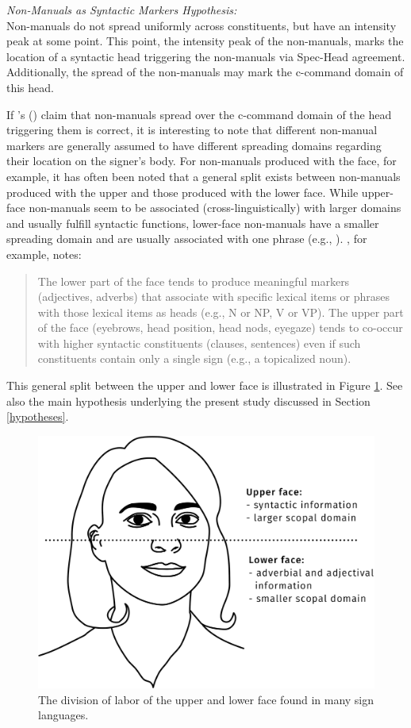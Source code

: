 \begin{exe}
\ex \textit{Non-Manuals as Syntactic Markers Hypothesis:}\\
Non-manuals do not spread uniformly across constituents, but have an intensity peak at some point. This point, the intensity peak of the non-manuals, marks the location of a syntactic head triggering the non-manuals via Spec-Head agreement. Additionally, the spread of the non-manuals may mark the c-command domain of this head. \label{nmasmh}
\end{exe}

\noindent If \citeauthor{neidle2000syntax}'s (\citeyear{neidle2000syntax}) claim that non-manuals spread over the c-command domain of the head triggering them is correct, it is interesting to note that different non-manual markers are generally assumed to have different spreading domains regarding their location on the signer's body. For non-manuals produced with the face, for example, it has often been noted that a general split exists between non-manuals produced with the upper and those produced with the lower face. While upper-face non-manuals seem to be associated (cross-linguistically) with larger domains and usually fulfill syntactic functions, lower-face non-manuals have a smaller spreading domain and are usually associated with one phrase (e.g., \citealt{liddell1980american, coerts1992nonmanual, wilbur2000phonological, wilbur2003modality, brentari2002prosody}). \citet[249]{wilbur2009productive}, for example, notes: 


\begin{quote}
The lower part\label{wilburquote} of the face tends to produce meaningful markers (adjectives, adverbs) that associate with specific lexical items or phrases with those lexical items as heads (e.g., N or NP, V or VP). The upper part of the face (eyebrows, head position, head nods, eyegaze) tends to co-occur with higher syntactic constituents (clauses, sentences) even if such constituents contain only a single sign (e.g., a topicalized noun). 
\end{quote}

\noindent This general split between the upper and lower face is illustrated in Figure \ref{upperlowerfacedivisionoflabour}. See also the main hypothesis underlying the present study discussed in Section \ref{hypotheses}.

\begin{figure}
\centering
	\includegraphics[width=.6\textwidth]{face}
	\caption{The division of labor of the upper and lower face found in many sign languages.}
	\label{upperlowerfacedivisionoflabour}
\end{figure}


